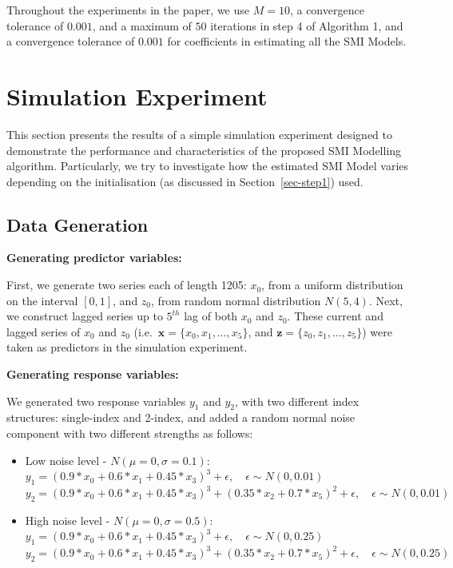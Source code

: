 \documentclass[11pt,a4paper,]{article}
\begin{document}
Throughout the experiments in the paper, we use \(M = 10\), a
convergence tolerance of \(0.001\), and a maximum of \(50\) iterations
in step 4 of Algorithm 1, and a convergence tolerance of \(0.001\) for
coefficients in estimating all the SMI Models.

\hypertarget{sec-simulation}{%
\section{Simulation Experiment}\label{sec-simulation}}

This section presents the results of a simple simulation experiment
designed to demonstrate the performance and characteristics of the
proposed SMI Modelling algorithm. Particularly, we try to investigate
how the estimated SMI Model varies depending on the initialisation (as
discussed in Section~\ref{sec-step1}) used.

\hypertarget{sec-datagen}{%
\subsection{Data Generation}\label{sec-datagen}}

\textbf{Generating predictor variables:}

First, we generate two series each of length 1205: \(x_{0}\), from a
uniform distribution on the interval \([0, 1]\), and \(z_{0}\), from
random normal distribution \(N(5, 4)\). Next, we construct lagged series
up to \(5^{th}\) lag of both \(x_{0}\) and \(z_{0}\). These current and
lagged series of \(x_{0}\) and \(z_{0}\)
(i.e.~\(\bm{x} = \{x_{0}, x_{1}, \dots, x_{5}\}\), and
\(\bm{z} = \{z_{0}, z_{1}, \dots, z_{5}\}\)) were taken as predictors in
the simulation experiment.

\textbf{Generating response variables:}

We generated two response variables \(y_{1}\) and \(y_{2}\), with two
different index structures: single-index and 2-index, and added a random
normal noise component with two different strengths as follows:

\begin{itemize}
\item
  Low noise level - \(N(\mu = 0, \sigma = 0.1)\):\\
  \(y_{1} = (0.9*x_{0} + 0.6*x_{1} + 0.45*x_{3})^3 + \epsilon, \quad \epsilon\sim N(0, 0.01)\)\\
  \(y_{2} = (0.9*x_{0} + 0.6*x_{1} + 0.45*x_{3})^3 + (0.35*x_{2} + 0.7*x_{5})^2 + \epsilon, \quad \epsilon\sim N(0, 0.01)\)
\item
  High noise level - \(N(\mu = 0, \sigma = 0.5)\):\\
  \(y_{1} = (0.9*x_{0} + 0.6*x_{1} + 0.45*x_{3})^3 + \epsilon, \quad \epsilon\sim N(0, 0.25)\)\\
  \(y_{2} = (0.9*x_{0} + 0.6*x_{1} + 0.45*x_{3})^3 + (0.35*x_{2} + 0.7*x_{5})^2 + \epsilon, \quad \epsilon\sim N(0, 0.25)\)
\end{itemize}
\end{document}
